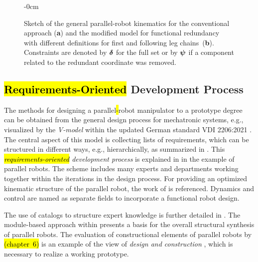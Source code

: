 \vspace{-9pt}
\begin{figure}[H]
  \begin{adjustwidth}{-\extralength}{0cm}
    \centering
    \graphicspath{{Figures/}}
    
  \end{adjustwidth}
  \caption{Sketch %
    of the general parallel-robot kinematics for the conventional approach (\textbf{a}) and the modified model for functional redundancy with different definitions for first and following leg chains~(\textbf{b}). Constraints are denoted by $\boldsymbol{\delta}$ for the full set or by $\boldsymbol{\psi}$ if a component related to the redundant coordinate was removed.}
  \label{fig:kinematic_constraints}
\end{figure}


\subsection{\hl{Requirements-Oriented} Development Process} %
\label{sec:ds_soa_design}

The methods for designing a parallel\hl{-}robot manipulator to a prototype degree can be obtained from the general design process for mechatronic systems, e.g., visualized by the \emph{V-model} within the updated German standard VDI 2206:2021 \cite{VDI2206}.
The central aspect of this model is collecting lists of requirements, which can be structured in different ways, e.g., hierarchically, as summarized in \cite{MaierEzhFadSum2007}.
This \emph{\hl{requirements-oriented} development process} is explained in \cite{StechertFra2009} in the example of parallel robots.
The scheme includes many experts and departments working together within the iterations in the design process.
For providing an optimized kinematic structure of the parallel robot, the work of \cite{Krefft2006} is referenced.
Dynamics and control are named as separate fields to incorporate a functional robot design.

The use of catalogs to structure expert knowledge is further detailed in \cite{StechertFraVie2010}.
The module-based approach within \cite{Frindt2001} presents a basis for the overall structural synthesis of parallel robots.
The evaluation of constructional elements of parallel robots by \cite{Neugebauer2006} \hl{(chapter~6)} %
%
is an example of the view of \emph{design and construction} \cite{StechertFra2009}, which is necessary to realize a working prototype.



